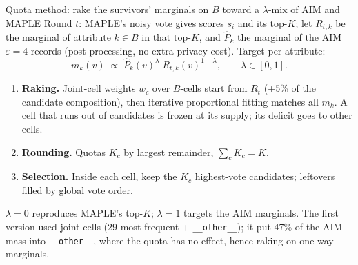 \documentclass[11pt,aspectratio=169]{beamer}
\newcommand{\Phat}{\hat P}
\begin{document}
\begin{frame}{Quota method: rake the survivors' marginals on $B$ toward a $\lambda$-mix of AIM and MAPLE}
Round $t$: MAPLE's noisy vote gives scores $s_i$ and its top-$K$; let $R_{t,k}$ be the marginal of attribute $k \in B$ in that top-$K$, and $\Phat_k$ the marginal of the AIM $\varepsilon{=}4$ records (post-processing, no extra privacy cost). Target per attribute:
\[
  m_k(v) \;\propto\; \Phat_k(v)^{\lambda}\; R_{t,k}(v)^{1-\lambda}, \qquad \lambda \in [0,1].
\]

\vspace{-0.3em}
\begin{enumerate}
  \item \textbf{Raking.} Joint-cell weights $w_c$ over $B$-cells start from $R_t$ (+5\% of the candidate composition), then iterative proportional fitting matches all $m_k$. A cell that runs out of candidates is frozen at its supply; its deficit goes to other cells.
  \item \textbf{Rounding.} Quotas $K_c$ by largest remainder, $\sum_c K_c = K$.
  \item \textbf{Selection.} Inside each cell, keep the $K_c$ highest-vote candidates; leftovers filled by global vote order.
\end{enumerate}

\medskip
$\lambda = 0$ reproduces MAPLE's top-$K$; $\lambda = 1$ targets the AIM marginals. The first version used joint cells (29 most frequent + \texttt{\_\_other\_\_}); it put 47\% of the AIM mass into \texttt{\_\_other\_\_}, where the quota has no effect, hence raking on one-way marginals.
\end{frame}
\end{document}

